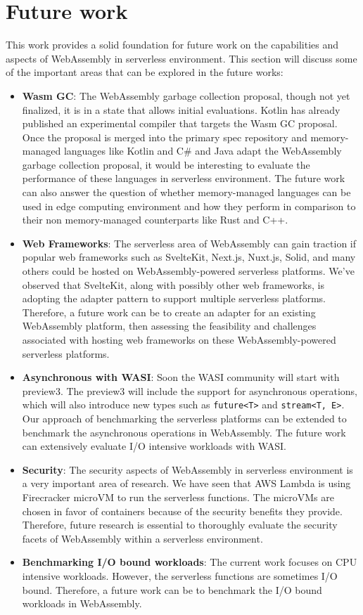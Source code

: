 \chapter{Future work}
\label{chap:future-work}

This work provides a solid foundation for future work on the capabilities and aspects of \hbox{WebAssembly} in \gls{serverless} environment. This section will discuss some of the important areas that can be explored in the future works:
\begin{itemize}
    \item \textbf{Wasm GC}: The WebAssembly garbage collection proposal, though not yet finalized, it is in a state that allows initial evaluations. Kotlin has already published an experimental compiler that targets the Wasm GC proposal. Once the proposal is merged into the primary spec repository and memory-managed languages like Kotlin and C\# and Java adapt the \gls{WebAssembly} garbage collection proposal, it would be interesting to evaluate the performance of these languages in serverless environment. The future work can also answer the question of whether memory-managed languages can be used in edge computing environment and how they perform in comparison to their non memory-managed counterparts like Rust and C++.
    \item \textbf{Web Frameworks}: The serverless area of WebAssembly can gain traction if popular web frameworks such as SvelteKit, Next.js, Nuxt.js, Solid, and many others could be hosted on WebAssembly-powered serverless platforms. We've observed that \hbox{SvelteKit}, along with possibly other web frameworks, is adopting the adapter pattern \cite{sveltecommunity_2023_adapter} to support multiple serverless platforms. Therefore, a future work can be to create an adapter for an existing WebAssembly platform, then assessing the feasibility and challenges associated with hosting web frameworks on these WebAssembly-powered serverless platforms.
    \item \textbf{Asynchronous with WASI}: Soon the WASI community will start with preview3. The preview3 \cite{gohman_2023_wasi} will include the support for asynchronous operations, which will also introduce new types such as \texttt{future<T>} and \texttt{stream<T, E>}. Our approach of benchmarking the serverless platforms can be extended to benchmark the asynchronous operations in WebAssembly. The future work can extensively evaluate I/O intensive workloads with WASI.
    \item \textbf{Security}: The security aspects of WebAssembly in serverless environment is a very important area of research. We have seen that AWS Lambda is using Firecracker \hbox{microVM} to run the serverless functions. The microVMs are chosen in favor of containers because of the security benefits they provide. Therefore, future research is essential to thoroughly evaluate the security facets of WebAssembly within a serverless environment.
    \item \textbf{Benchmarking I/O bound workloads}: The current work focuses on CPU intensive workloads. However, the serverless functions are sometimes I/O bound. Therefore, a future work can be to benchmark the I/O bound workloads in WebAssembly.
\end{itemize}
